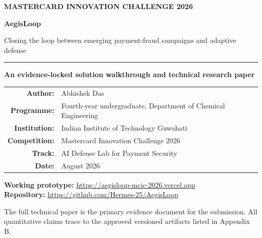 \documentclass[11pt,a4paper,oneside]{article}
\begin{document}
\begin{titlepage}
  \thispagestyle{empty}
  \centering
  \vspace*{13mm}
  {\small\bfseries\color{AEGOrange} MASTERCARD INNOVATION CHALLENGE 2026\par}
  \vspace{17mm}
  {\fontsize{36}{40}\selectfont\bfseries\color{AEGInk} AegisLoop\par}
  \vspace{4mm}
  {\Large Closing the loop between emerging payment-fraud campaigns and adaptive defense\par}
  \vspace{10mm}
  {\color{AEGOrange}\rule{0.72\textwidth}{1.2pt}\par}
  \vspace{14mm}
  {\large\bfseries An evidence-locked solution walkthrough and technical research paper\par}
  \vfill
  \begin{tabular}{rl}
    \textbf{Author:} & Abhishek Das \\
    \textbf{Programme:} & Fourth-year undergraduate, Department of Chemical Engineering \\
    \textbf{Institution:} & Indian Institute of Technology Guwahati \\
    \textbf{Competition:} & Mastercard Innovation Challenge 2026 \\
    \textbf{Track:} & AI Defense Lab for Payment Security \\
    \textbf{Date:} & August 2026
  \end{tabular}
  \vfill
  \begin{minipage}{0.82\textwidth}
    \centering\small
    \textbf{Working prototype:} \url{https://aegisloop-mcic-2026.vercel.app}\\[2mm]
    \textbf{Repository:} \url{https://github.com/Hermes-25/AegisLoop}
  \end{minipage}
  \par
  \vspace{9mm}
  {\footnotesize The full technical paper is the primary evidence document for the submission. All quantitative claims trace to the approved versioned artifacts listed in Appendix B.\par}
\end{titlepage}
\end{document}
